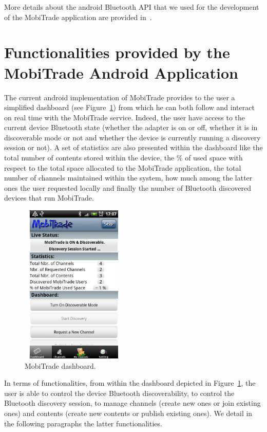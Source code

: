 More details about the android Bluetooth API that we used for the development of the MobiTrade application are provided in~\cite{AndroidBluetoothAPI}. 

\section{Functionalities provided by the MobiTrade Android Application}
\label{MobiTradeCurrentFunctionalities}

The current android implementation of MobiTrade provides to the user a simplified dashboard (see Figure~\ref{dashboard}) from which he can both follow and interact on real time with the MobiTrade service. Indeed, the user have access to the current device Bluetooth state (whether the adapter is on or off, whether it is in discoverable mode or not and whether the device is currently running a discovery session or not). A set of statistics are also presented within the dashboard like the total number of contents stored within the device, the \% of used space with respect to the total space allocated to the MobiTrade application, the total number of channels maintained within the system, how much among the latter ones the user requested locally and finally the number of Bluetooth discovered devices that run MobiTrade.
 
\begin{figure}[!h]
\begin{center}
\includegraphics[width=2in,height=3in]{Chapitre6/Dashboard.png}
\end{center}
\caption{MobiTrade dashboard.}
\label{dashboard}
\end{figure}

In terms of functionalities, from within the dashboard depicted in Figure~\ref{dashboard}, the user is able to control the device Bluetooth discoverability, to control 
the Bluetooth discovery session, to manage channels (create new ones or join existing ones) and contents (create new contents or publish existing ones). We detail in the following paragraphs the latter functionalities.

